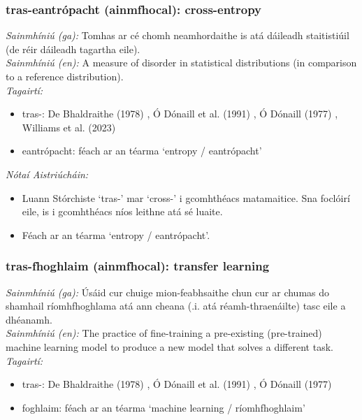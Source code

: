 \subsubsection*{tras-eantrópacht (ainmfhocal): cross-entropy}
 \noindent \textit{Sainmhíniú (ga):} Tomhas ar cé chomh neamhordaithe is atá dáileadh staitistiúil (de réir dáileadh tagartha eile).
\\
 \noindent \textit{Sainmhíniú (en):} A measure of disorder in statistical distributions (in comparison to a reference distribution).
\\
 \noindent \textit{Tagairtí:}
\begin{itemize}
	\item tras-: De Bhaldraithe (1978) \cite{de-bhaldraithe}, Ó Dónaill et al. (1991) \cite{focloir-beag}, Ó Dónaill (1977) \cite{odonaill}, Williams et al. (2023) \cite{storchiste}
	\item eantrópacht: féach ar an téarma `entropy / eantrópacht'
\end{itemize}

 \noindent \textit{Nótaí Aistriúcháin:}
\begin{itemize}
	\item Luann Stórchiste `tras-' mar `cross-' i gcomhthéacs matamaitice. Sna foclóirí eile, is i gcomhthéacs níos leithne atá sé luaite.
	\item Féach ar an téarma `entropy / eantrópacht'.
\end{itemize}


\subsubsection*{tras-fhoghlaim (ainmfhocal): transfer learning}
 \noindent \textit{Sainmhíniú (ga):} Úsáid cur chuige mion-feabhsaithe chun cur ar chumas do shamhail ríomhfhoghlama atá ann cheana (.i. atá réamh-thraenáilte) tasc eile a dhéanamh.
\\
 \noindent \textit{Sainmhíniú (en):} The practice of fine-training a pre-existing (pre-trained) machine learning model to produce a new model that solves a different task.
\\
 \noindent \textit{Tagairtí:}
\begin{itemize}
	\item tras-: De Bhaldraithe (1978) \cite{de-bhaldraithe}, Ó Dónaill et al. (1991) \cite{focloir-beag}, Ó Dónaill (1977) \cite{odonaill}
	\item foghlaim: féach ar an téarma `machine learning / ríomhfhoghlaim'
\end{itemize}

